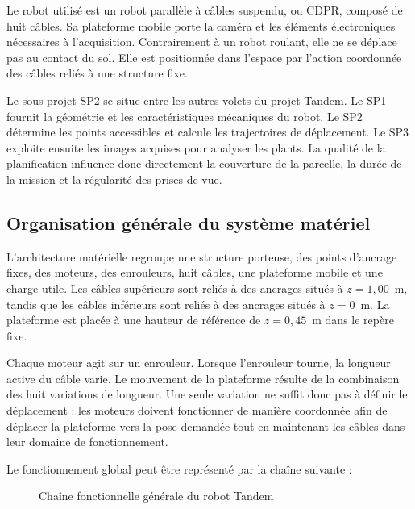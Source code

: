Le robot utilisé est un robot parallèle à câbles suspendu, ou CDPR, composé de huit câbles. Sa plateforme mobile porte la caméra et les éléments électroniques nécessaires à l'acquisition. Contrairement à un robot roulant, elle ne se déplace pas au contact du sol. Elle est positionnée dans l'espace par l'action coordonnée des câbles reliés à une structure fixe.

Le sous-projet SP2 se situe entre les autres volets du projet Tandem. Le SP1 fournit la géométrie et les caractéristiques mécaniques du robot. Le SP2 détermine les points accessibles et calcule les trajectoires de déplacement. Le SP3 exploite ensuite les images acquises pour analyser les plants. La qualité de la planification influence donc directement la couverture de la parcelle, la durée de la mission et la régularité des prises de vue.

\subsection{Organisation générale du système matériel}

L'architecture matérielle regroupe une structure porteuse, des points d'ancrage fixes, des moteurs, des enrouleurs, huit câbles, une plateforme mobile et une charge utile. Les câbles supérieurs sont reliés à des ancrages situés à $z=1{,}00$~m, tandis que les câbles inférieurs sont reliés à des ancrages situés à $z=0$~m. La plateforme est placée à une hauteur de référence de $z=0{,}45$~m dans le repère fixe.

Chaque moteur agit sur un enrouleur. Lorsque l'enrouleur tourne, la longueur active du câble varie. Le mouvement de la plateforme résulte de la combinaison des huit variations de longueur. Une seule variation ne suffit donc pas à définir le déplacement : les moteurs doivent fonctionner de manière coordonnée afin de déplacer la plateforme vers la pose demandée tout en maintenant les câbles dans leur domaine de fonctionnement.

Le fonctionnement global peut être représenté par la chaîne suivante :

\begin{figure}[H]
\centering
\begin{minipage}{0.92\textwidth}
\centering
{}
\end{minipage}
\caption{Chaîne fonctionnelle générale du robot Tandem}
\label{fig:chaine_materielle}
\end{figure}

